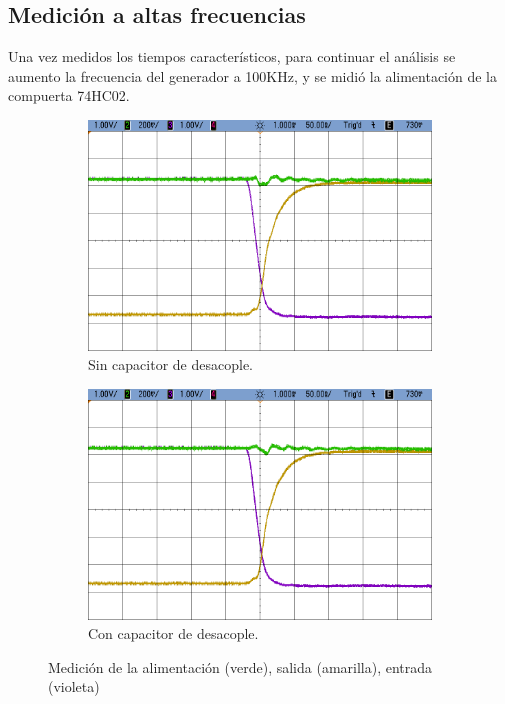 \subsection{Medici\'on a altas frecuencias}
\noindent
Una vez medidos los tiempos caracter\'isticos, para continuar el an\'alisis se aumento la frecuencia del generador a 100KHz, y se midi\'o la alimentaci\'on de la compuerta 74HC02.\\
\begin{figure}[H]
\begin{subfigure}{.5\textwidth}
  \centering
  \includegraphics[width=.85\linewidth]{figs/EJ4/HF_sin_C.png}  
  \caption{Sin capacitor de desacople.}
  \label{ej4_fig:HF_sin_C}
\end{subfigure}
\begin{subfigure}{.5\textwidth}
  \centering
  \includegraphics[width=.85\linewidth]{figs/EJ4/HF_con_C.png}  
  \caption{Con capacitor de desacople.}
  \label{ej4_fig:HF_con_C}
\end{subfigure}
\caption{Medici\'on de la alimentaci\'on (verde), salida (amarilla), entrada (violeta)}
\label{ej4_fig:HF}
\end{figure}
